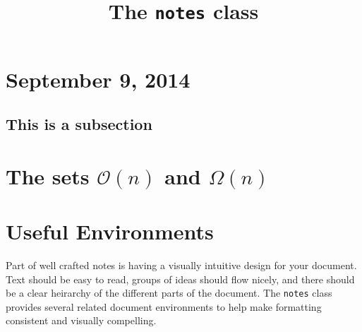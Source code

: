 \documentclass{notes}
\title{The \texttt{notes} class}
\begin{document}
	\section{September 9, 2014}
	\kant[1]
	\subsection{This is a subsection}
	\kant[2-4]
	\section{The sets $\mathcal{O}(n)$ and $\Omega(n)$}
	\kant[5-7]
	
	\section{Useful Environments}
	Part of well crafted notes is having a visually intuitive design for your document.
	Text should be easy to read, groups of ideas should flow nicely, and there should be a clear heirarchy of the different parts of the document.
	The \texttt{notes} class provides several related document environments to help make formatting consistent and visually compelling.
\end{document}
